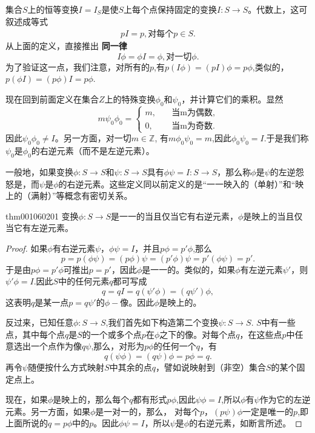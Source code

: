 集合$S$上的恒等变换$I = I_{S}$是使$S$上每个点保持固定的变换$I:S \to S$。代数上，这可叙述成等式
\begin{gather}\label{equ001060203}
pI = p, \text{对每个}p \in S.
\end{gather}
从上面的定义，直接推出
\textbf{同一律}
\[
I\phi = \phi{}I = \phi, \text{对一切}\phi.
\]
为了验证这一点，我们注意，对所有的$p$,有$p(I\phi) = (pI)\phi = p\phi$,类似的，$p(\phi{}I) = (p\phi)I = p\phi$.

现在回到前面定义在集合$Z$上的特殊变换$\phi_0$和$\psi_0$，并计算它们的乘积。显然
\[
m\psi_0\phi_0 = \left\{
\begin{aligned}
m, &\quad \text{当m为偶数},\\
0, &\quad \text{当m为奇数}.
\end{aligned}
\right.
\]
因此$\psi_0\phi_0 \neq I$。另一方面，对一切$m \in \mathbb{Z}$, 有$m\phi_0\psi_0 = m$,因此$\phi_0\psi_0 = I$.于是我们称$\psi_0$是$\phi_0$的右逆元素（而不是左逆元素）。

一般地，如果变换$\phi:S \to S$和$\psi:S \to S$具有$\phi\psi = I: S \to S$，那么称$\phi$是$\psi$的左逆怨怒是，而$\psi$是$\phi$的右逆元素。这些定义同以前定义的是“一一映入的（单射）”和“映上的（满射）”等概念有密切关系。

\begin{theorem}{}{thm001060201}
变换$\phi:S \to S$是一一的当且仅当它有右逆元素，$\phi$是映上的当且仅当它有左逆元素。
\end{theorem}

\begin{proof}
如果$\phi$有右逆元素$\psi$，$\phi\psi = I$，并且$p\phi = p'\phi$,那么
\[
p = p(\phi\psi) = (p\phi)\psi = (p'\phi)\psi = p'(\phi\psi) = p'.
\]
于是由$p\phi = p'\phi$可推出$p=p'$，因此$\phi$是一一的。类似的，如果$\phi$有左逆元素$\psi'$，则$\psi'\phi = I$.因此$S$中的任何元素$q$都可写成
\[
q = qI = q(\psi'\phi) = (q\psi')\phi,
\]
这表明$q$是某一点$p = q\psi'$的$\phi-$像。因此$\phi$是映上的。

反过来，已知任意$\phi:S \to S$,我们首先如下构造第二个变换$\psi:S \to S$. $S$中有一些点，其中每个点$q$是$S$的一个或多个点$p$在$\phi$之下的像。对每个点$q$，在这些点$p$中任意选出一个点作为像$q\psi$,那么，对形为$p\phi$的任何一个$q$，有
\[
q(\psi\phi) = (q\psi)\phi = p\phi = q.
\]
再令$\psi$随便按什么方式映射$S$中其余的点$q$，譬如说映射到（非空）集合$S$的某个固定点上。

现在，如果$\phi$是映上的，那么每个$q$都有形式$p\phi$,因此$\psi\phi=I$,所以$\phi$有$\psi$作为它的左逆元素。另一方面，如果$\phi$是一对一的，那么， 对每个$p$，$(p\psi)\phi$一定是唯一的$p$,即上面所说的$q = p\phi$中的$p$。因此$\phi\psi=I$，所以$\psi$是$\phi$的右逆元素，如断言所述。
\end{proof}

